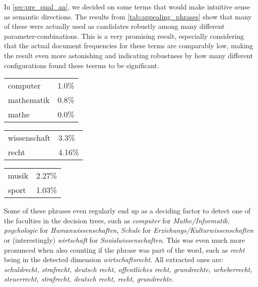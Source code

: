 In \autoref{sec:pre_qual_an}, we decided on some terms that would make intuitive sense as semantic directions. The results from \autoref{tab:appealing_phrases} show that many of these were actually used as candidates robustly among many different parameter-combinations. This is a very promising result, especially considering that the actual document frequencies for these terms are comparably low, making the result even more astonishing and indicating robustness by how many different configurations found these teerms to be significant. \\

\vspace{-2.5ex}
\begingroup
\renewcommand{\arraystretch}{0.75}
\begin{minipage}[t]{.33\textwidth}
	\begin{tabular}{ll}
		computer     & 1.0\% \\
		mathematik   & 0.8\% \\
		mathe        & 0.0\% 
	\end{tabular}
\end{minipage}\hfil
\begin{minipage}[t]{.33\textwidth}
	\begin{tabular}{ll}
		wissenschaft & 3.3\% \\
		recht        & 4.16\% 
	\end{tabular}
\end{minipage}
\begin{minipage}[t]{.33\textwidth}
	\begin{tabular}{ll}
		musik        & 2.27\% \\
		sport        & 1.03\% 
	\end{tabular}
\end{minipage}
\endgroup
\vspace{0.4ex}

Some of these phrases even regularly end up as a deciding factor to detect one of the faculties in the decision trees, such as \textit{computer} for \textit{Mathe/Informatik}, \textit{psychologie} for \textit{Humanwissenschaften}, \textit{Schule} for \textit{Erziehungs/Kulturwissenschaften} or (interestingly) \textit{wirtschaft} for \textit{Sozialwissenschaften}. This was even much more pronunced when also counting if the phrase was part of the word, such as \textit{recht} being in the detected dimension \textit{wirtschaftsrecht}. All extracted ones are: \textit{schuldrecht, strafrecht, deutsch recht, offentliches recht, grundrechte, urheberrecht, steuerrecht, strafrecht, deutsch recht, recht, grundrechte}.


